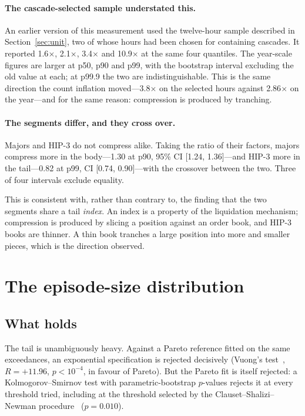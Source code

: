 \documentclass[11pt,a4paper]{article}
\begin{document}
\paragraph{The cascade-selected sample understated this.} An earlier version of this measurement
used the twelve-hour sample described in Section~\ref{sec:unit}, two of whose hours had been
chosen for containing cascades. It reported 1.6$\times$, 2.1$\times$, 3.4$\times$ and
10.9$\times$ at the same four quantiles. The year-scale figures are larger at p50, p90 and p99,
with the bootstrap interval excluding the old value at each; at p99.9 the two are
indistinguishable. This is the same direction the count inflation moved---3.8$\times$ on the
selected hours against 2.86$\times$ on the year---and for the same reason: compression is
produced by tranching.

\paragraph{The segments differ, and they cross over.} Majors and HIP-3 do not compress alike.
Taking the ratio of their factors, majors compress more in the body---1.30 at p90, 95\% CI
[1.24, 1.36]---and HIP-3 more in the tail---0.82 at p99, CI [0.74, 0.90]---with the crossover
between the two. Three of four intervals exclude equality.

This is consistent with, rather than contrary to, the finding that the two segments share a tail
\emph{index}. An index is a property of the liquidation mechanism; compression is produced by
slicing a position against an order book, and HIP-3 books are thinner. A thin book tranches a
large position into more and smaller pieces, which is the direction observed.

\section{The episode-size distribution}
\label{sec:tail}

\subsection{What holds}

The tail is unambiguously heavy. Against a Pareto reference fitted on the same exceedances, an
exponential specification is rejected decisively (Vuong's test~\cite{vuong1989}, $R = +11.96$, $p < 10^{-4}$, in favour of
Pareto). But the Pareto fit is itself rejected: a Kolmogorov--Smirnov test with
parametric-bootstrap $p$-values rejects it at every threshold tried, including at the threshold
selected by the Clauset--Shalizi--Newman procedure~\cite{clauset2009} ($p = 0.010$).
\end{document}
